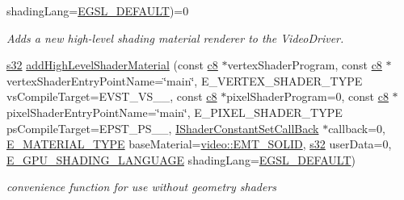 \begin{DoxyCompactItemize}
shading\+Lang=\hyperlink{namespaceirr_1_1video_a913671e32f20f13e51336bfbe20a82a3ac65c039e1c80a430a816c450a5f30d4b}{E\+G\+S\+L\+\_\+\+D\+E\+F\+A\+U\+LT})=0
\begin{DoxyCompactList}\small\item\em Adds a new high-\/level shading material renderer to the Video\+Driver. \end{DoxyCompactList}\item 
\mbox{\label{classirr_1_1video_1_1IGPUProgrammingServices_aa65337bb19777dd025ff02f1953277b6}} 
\hyperlink{namespaceirr_ac66849b7a6ed16e30ebede579f9b47c6}{s32} \hyperlink{classirr_1_1video_1_1IGPUProgrammingServices_aa65337bb19777dd025ff02f1953277b6}{add\+High\+Level\+Shader\+Material} (const \hyperlink{namespaceirr_a9395eaea339bcb546b319e9c96bf7410}{c8} $\ast$vertex\+Shader\+Program, const \hyperlink{namespaceirr_a9395eaea339bcb546b319e9c96bf7410}{c8} $\ast$vertex\+Shader\+Entry\+Point\+Name=\char`\"{}main\char`\"{}, E\+\_\+\+V\+E\+R\+T\+E\+X\+\_\+\+S\+H\+A\+D\+E\+R\+\_\+\+T\+Y\+PE vs\+Compile\+Target=E\+V\+S\+T\+\_\+\+V\+S\+\_\+\_, const \hyperlink{namespaceirr_a9395eaea339bcb546b319e9c96bf7410}{c8} $\ast$pixel\+Shader\+Program=0, const \hyperlink{namespaceirr_a9395eaea339bcb546b319e9c96bf7410}{c8} $\ast$pixel\+Shader\+Entry\+Point\+Name=\char`\"{}main\char`\"{}, E\+\_\+\+P\+I\+X\+E\+L\+\_\+\+S\+H\+A\+D\+E\+R\+\_\+\+T\+Y\+PE ps\+Compile\+Target=E\+P\+S\+T\+\_\+\+P\+S\+\_\+\_, \hyperlink{classirr_1_1video_1_1IShaderConstantSetCallBack}{I\+Shader\+Constant\+Set\+Call\+Back} $\ast$callback=0, \hyperlink{namespaceirr_1_1video_ac8e9b6c66f7cebabd1a6d30cbc5430f1}{E\+\_\+\+M\+A\+T\+E\+R\+I\+A\+L\+\_\+\+T\+Y\+PE} base\+Material=\hyperlink{namespaceirr_1_1video_ac8e9b6c66f7cebabd1a6d30cbc5430f1a9bc471b9c18c9e2d20496004d2a2e803}{video\+::\+E\+M\+T\+\_\+\+S\+O\+L\+ID}, \hyperlink{namespaceirr_ac66849b7a6ed16e30ebede579f9b47c6}{s32} user\+Data=0, \hyperlink{namespaceirr_1_1video_a913671e32f20f13e51336bfbe20a82a3}{E\+\_\+\+G\+P\+U\+\_\+\+S\+H\+A\+D\+I\+N\+G\+\_\+\+L\+A\+N\+G\+U\+A\+GE} shading\+Lang=\hyperlink{namespaceirr_1_1video_a913671e32f20f13e51336bfbe20a82a3ac65c039e1c80a430a816c450a5f30d4b}{E\+G\+S\+L\+\_\+\+D\+E\+F\+A\+U\+LT})
\begin{DoxyCompactList}\small\item\em convenience function for use without geometry shaders \end{DoxyCompactList}\item 

\end{DoxyCompactItemize}
